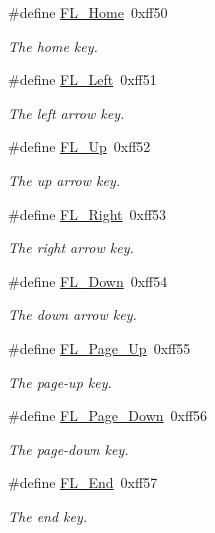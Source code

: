 \begin{Indent}
\begin{DoxyCompactItemize}
\#define \hyperlink{_enumerations_8_h_a6fecadc9ecc21f06822c79ced2e45932}{F\+L\+\_\+\+Home}~0xff50
\begin{DoxyCompactList}\small\item\em The home key. \end{DoxyCompactList}\item 
\#define \hyperlink{_enumerations_8_h_afe89caa1c5019809095a6129156f7c5a}{F\+L\+\_\+\+Left}~0xff51
\begin{DoxyCompactList}\small\item\em The left arrow key. \end{DoxyCompactList}\item 
\#define \hyperlink{_enumerations_8_h_a050700391ba0940ca16b0e5dbf4644f0}{F\+L\+\_\+\+Up}~0xff52
\begin{DoxyCompactList}\small\item\em The up arrow key. \end{DoxyCompactList}\item 
\#define \hyperlink{_enumerations_8_h_a45679ed656e6b248319719719e894f13}{F\+L\+\_\+\+Right}~0xff53
\begin{DoxyCompactList}\small\item\em The right arrow key. \end{DoxyCompactList}\item 
\#define \hyperlink{_enumerations_8_h_a7b70dabd5fc84d90552442584a0e8b91}{F\+L\+\_\+\+Down}~0xff54
\begin{DoxyCompactList}\small\item\em The down arrow key. \end{DoxyCompactList}\item 
\#define \hyperlink{_enumerations_8_h_a35834a5c204afffb06374e25734b5c76}{F\+L\+\_\+\+Page\+\_\+\+Up}~0xff55
\begin{DoxyCompactList}\small\item\em The page-\/up key. \end{DoxyCompactList}\item 
\#define \hyperlink{_enumerations_8_h_ada4d587d21ab710f44043dafba88e110}{F\+L\+\_\+\+Page\+\_\+\+Down}~0xff56
\begin{DoxyCompactList}\small\item\em The page-\/down key. \end{DoxyCompactList}\item 
\#define \hyperlink{_enumerations_8_h_a3278d6209799b821e07369aa5dc140ac}{F\+L\+\_\+\+End}~0xff57
\begin{DoxyCompactList}\small\item\em The end key. \end{DoxyCompactList}\item 

\end{DoxyCompactItemize}
\end{Indent}
